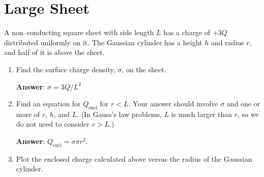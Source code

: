 \documentclass{article}
\begin{document}
\newpage

\section{Large Sheet}



A non--conducting square sheet with side length $L$ has a charge of $+3Q$ distributed uniformly on it. The Gaussian cylinder has a height $h$ and radius $r$, and half of it is above the sheet.

\begin{enumerate}

  \item Find the surface charge density, $\sigma$, on the sheet.

        \ifsolutions
          \textbf{Answer}: $\sigma=3Q/L^2$
        \else
          \vskip 36.135pt
        \fi

  \item Find an equation for $Q_{\text{encl}}$ for $r<L$. Your answer should involve $\sigma$ and one or more of $r$, $h$, and $L$. (In Gauss's law problems, $L$ is much larger than $r$, so we do not need to consider $r > L$.)

        \ifsolutions
          \textbf{Answer}: $Q_{\text{encl}}=\sigma \pi r^2$.
        \else
          \vskip 36.135pt
        \fi

  \item Plot the enclosed charge calculated above versus the radius of the Gaussian cylinder.

        \ifsolutions
          
        \fi

\end{enumerate}
\end{document}
